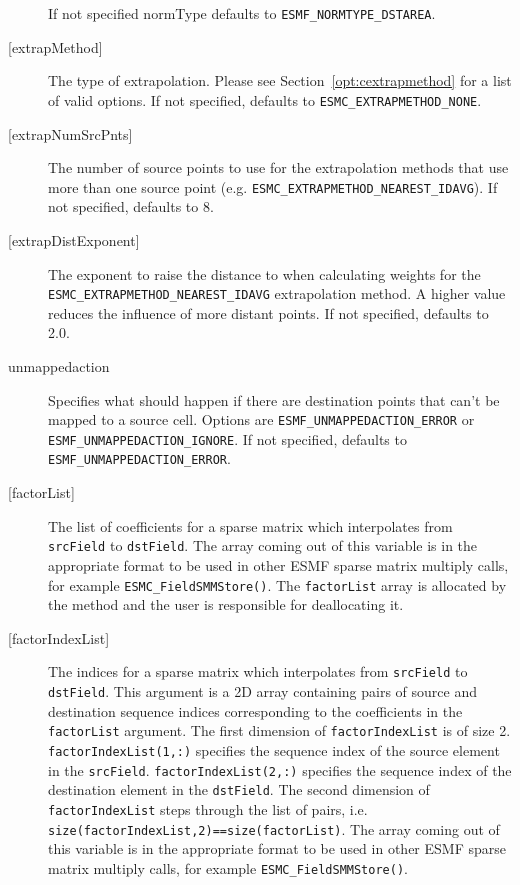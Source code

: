 \begin{description}
      If not specified normType defaults to {\tt ESMF\_NORMTYPE\_DSTAREA}.
    \item [{[extrapMethod]}]
      The type of extrapolation. Please see Section~\ref{opt:cextrapmethod} 
      for a list of valid options. If not specified, defaults to 
      {\tt ESMC\_EXTRAPMETHOD\_NONE}.
    \item [{[extrapNumSrcPnts]}] 
      The number of source points to use for the extrapolation methods that use more than one source point 
      (e.g. {\tt ESMC\_EXTRAPMETHOD\_NEAREST\_IDAVG}). If not specified, defaults to 8.
    \item [{[extrapDistExponent]}] 
      The exponent to raise the distance to when calculating weights for 
      the {\tt ESMC\_EXTRAPMETHOD\_NEAREST\_IDAVG} extrapolation method. A higher value reduces the influence 
      of more distant points. If not specified, defaults to 2.0.
    \item[unmappedaction]
      Specifies what should happen if there are destination points that can't 
      be mapped to a source cell. Options are {\tt ESMF\_UNMAPPEDACTION\_ERROR} or
      {\tt ESMF\_UNMAPPEDACTION\_IGNORE}. If not specified, defaults to {\tt ESMF\_UNMAPPEDACTION\_ERROR}.
    \item [{[factorList]}] 
      The list of coefficients for a sparse matrix which interpolates from {\tt srcField} to 
      {\tt dstField}. The array coming out of this variable is in the appropriate format to be used
      in other ESMF sparse matrix multiply calls, for example {\tt ESMC\_FieldSMMStore()}. 
      The {\tt factorList} array is allocated by the method and the user is responsible for 
      deallocating it. 
    \item [{[factorIndexList]}] 
      The indices for a sparse matrix which interpolates from {\tt srcField} to 
      {\tt dstField}. This argument is a 2D array containing pairs of source and destination
      sequence indices corresponding to the coefficients in the {\tt factorList} argument. 
      The first dimension of {\tt factorIndexList} is of size 2. {\tt factorIndexList(1,:)} specifies 
      the sequence index of the source element in the {\tt srcField}. {\tt factorIndexList(2,:)} specifies 
      the sequence index of the destination element in the {\tt dstField}. The second dimension of 
      {\tt factorIndexList} steps through the list of pairs, i.e. {\tt size(factorIndexList,2)==size(factorList)}.
      The array coming out of this variable is in the appropriate format to be used
      in other ESMF sparse matrix multiply calls, for example {\tt ESMC\_FieldSMMStore()}. 

\end{description}
